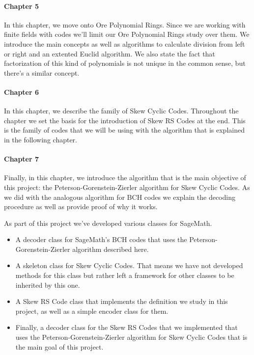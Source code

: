 \paragraph{Chapter 5} In this chapter, we move onto Ore Polynomial Rings.
Since we are working with finite fields with codes we'll limit our Ore Polynomial Rings study over them.
We introduce the main concepts as well as algorithms to calculate division from left or right and an extented Euclid algorithm.
We also state the fact that factorization of this kind of polynomials is not unique in the common sense, but there's a similar concept.

\paragraph{Chapter 6} In this chapter, we describe the family of Skew Cyclic Codes.
Throughout the chapter we set the basis for the introduction of Skew RS Codes at the end.
This is the family of codes that we will be using with the algorithm that is explained in the following chapter.

\paragraph{Chapter 7} Finally, in this chapter, we introduce the algorithm that is the main objective of this project: the Peterson-Gorenstein-Zierler algorithm for Skew Cyclic Codes.
As we did with the analogous algorithm for BCH codes we explain the decoding procedure as well as provide proof of why it works.

As part of this project we've developed various classes for SageMath.
\begin{itemize}
  \item A decoder class for SageMath's BCH codes that uses the Peterson-Gorenstein-Zierler algorithm described here.
  \item A skeleton class for Skew Cyclic Codes. That means we have not developed methods for this class but rather left a framework for other classes to be inherited by this one.
  \item A Skew RS Code class that implements the definition we study in this project, as well as a simple encoder class for them.
  \item Finally, a decoder class for the Skew RS Codes that we implemented that uses the Peterson-Gorenstein-Zierler algorithm for Skew Cyclic Codes that is the main goal of this project.
\end{itemize}

